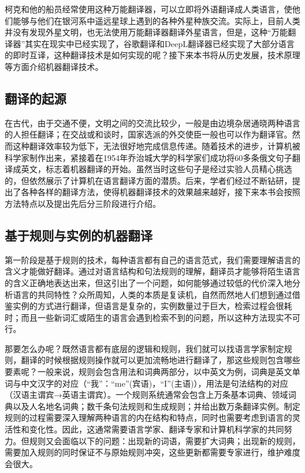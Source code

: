 柯克和他的船员经常使用这种万能翻译器，可以立即将外语翻译成人类语言，使他们能够与他们在银河系中遥远星球上遇到的各种外星种族交流。实际上，目前人类并没有发现外星文明，也无法使用万能翻译器翻译外星语言，但是，这种“万能翻译器”其实在现实中已经实现了，谷歌翻译和DeepL翻译器已经实现了大部分语言的即时互译，这种翻译技术是如何实现的呢？接下来本书将从历史发展，技术原理等方面介绍机器翻译技术。

\subsection{翻译的起源}
在古代，由于交通不便，文明之间的交流比较少，一般是由边境杂居通晓两种语言的人担任翻译；在交战或和谈时，国家选派的外交使臣一般也可以作为翻译官。然而这种翻译效率较为低下，无法很好地完成信息传递。随着技术的进步，计算机被科学家制作出来，紧接着在1954年乔治城大学的科学家们成功将60多条俄文句子翻译成英文，标志着机器翻译的开始。虽然当时这些句子是经过实验人员精心挑选的，但依然展示了计算机在语言翻译方面的潜质。后来，学者们经过不断钻研，提出了各种各样的翻译方法，使得机器翻译技术的效果越来越好，接下来本书会按照方法特点以及提出先后分三阶段进行介绍。

\subsection{基于规则与实例的机器翻译}
第一阶段是基于规则的技术，每种语言都有自己的语言范式，我们需要理解语言的含义才能做好翻译。通过对语言结构和句法规则的理解，翻译员才能够将陌生语言的含义正确地表达出来，但这引出了一个问题，如何能够通过较低的代价深入地分析语言的共同特性？众所周知，人类的本质是复读机，自然而然地人们想到通过借鉴实例的方式进行翻译，但语言是复杂的，实例数量过于巨大，检索过程会很耗时；而且一些新词汇或陌生的语言会遇到检索不到的问题，所以这种方法现实不可行。

那要怎么办呢？既然语言都有底层的逻辑和规则，我们就可以找语言学家制定规则，翻译的时候根据规则操作就可以更加流畅地进行翻译了，那这些规则包含哪些要素呢？一般来说，规则会包含用法和词典两部分，以中英文为例，词典是英文单词与中文汉字的对应（“我”：“me”(宾语)，“I”(主语)），用法是句法结构的对应（汉语主谓宾→英语主谓宾）。一个规则系统通常会包含上万条基本词典、领域词典以及人名地名词典；数千条句法规则和生成规则；并给出数万条翻译实例。制定规则的过程需要深入理解两种语言的内在结构和特点，同时也需要考虑到语言的灵活性和变化性。因此，这通常需要语言学家、翻译专家和计算机科学家的共同努力。但规则又会面临以下的问题：出现新的词语，需要扩大词典；出现新的规则，需要加入规则的同时保证不与原始规则冲突，这些更新都需要专家进行，维护难度会很大。

